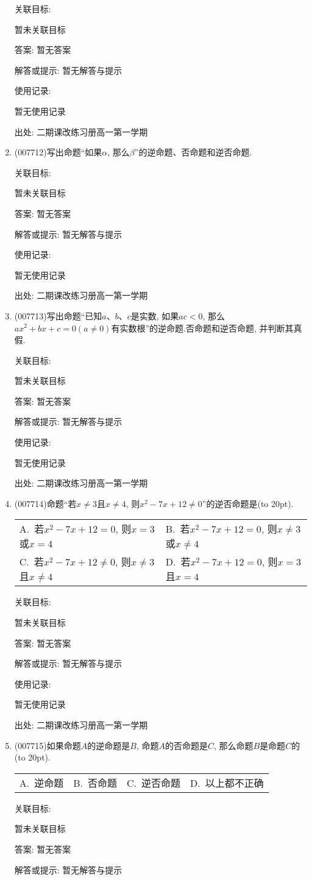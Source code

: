 \documentclass[10pt,a4paper]{article}
\newcommand{\bracket}[1]{(\hbox to #1pt{})}
\newcommand{\twoch}[4]{\par\begin{tabular}{p{.46\textwidth}p{.46\textwidth}}
A.~#1& B.~#2\\
C.~#3& D.~#4
\end{tabular}}
\newcommand{\fourch}[4]{\par\begin{tabular}{p{.23\textwidth}p{.23\textwidth}p{.23\textwidth}p{.23\textwidth}}
A.~#1 &B.~#2& C.~#3& D.~#4
\end{tabular}}
\begin{document}
\begin{enumerate}[1.]
关联目标:

暂未关联目标

答案: 暂无答案

解答或提示: 暂无解答与提示

使用记录:

暂无使用记录


出处: 二期课改练习册高一第一学期
\item { (007712)}写出命题``如果$\alpha$, 那么$\beta$''的逆命题、否命题和逆否命题.


关联目标:

暂未关联目标

答案: 暂无答案

解答或提示: 暂无解答与提示

使用记录:

暂无使用记录


出处: 二期课改练习册高一第一学期
\item { (007713)}写出命题``已知$a$、$b$、$c$是实数, 如果$ac<0$, 那么$ax^2+bx+c=0(a\ne 0)$有实数根''的逆命题.否命题和逆否命题, 并判断其真假.


关联目标:

暂未关联目标

答案: 暂无答案

解答或提示: 暂无解答与提示

使用记录:

暂无使用记录


出处: 二期课改练习册高一第一学期
\item { (007714)}命题``若$x\ne 3$且$x\ne 4$, 则$x^2-7x+12\ne 0$''的逆否命题是\bracket{20}.
\twoch{若$x^2-7x+12=0$, 则$x=3$或$x=4$}{若$x^2-7x+12=0$, 则$x\ne 3$或$x\ne 4$}{若$x^2-7x+12\ne 0$, 则$x\ne 3$且$x\ne 4$}{若$x^2-7x+12=0$, 则$x=3$且$x=4$}


关联目标:

暂未关联目标

答案: 暂无答案

解答或提示: 暂无解答与提示

使用记录:

暂无使用记录


出处: 二期课改练习册高一第一学期
\item { (007715)}如果命题$A$的逆命题是$B$, 命题$A$的否命题是$C$, 那么命题$B$是命题$C$的\bracket{20}.
\fourch{逆命题}{否命题}{逆否命题}{以上都不正确}


关联目标:

暂未关联目标

答案: 暂无答案

解答或提示: 暂无解答与提示


\end{enumerate}
\end{document}
